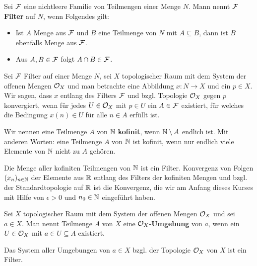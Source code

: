 \begin{defn}
	Sei $\mathcal{F}$ eine nichtleere Familie von Teilmengen einer Menge $N$. Mann nennt $\mathcal{F}$ \textbf{Filter} auf $N$, wenn Folgendes gilt: 
	\begin{itemize} 
		\item Ist $A$ Menge aus $\mathcal{F}$ und $B$ eine Teilmenge von $N$ mit $A \subseteq B$, dann ist $B$ ebenfalls Menge aus $\mathcal{F}$. 
		\item Aus $A, B \in \mathcal{F}$ folgt $A \cap B \in \mathcal{F}$. 
	\end{itemize} 
\end{defn} 

\begin{defn} 
	Sei $\mathcal{F}$ Filter auf einer Menge $N$, sei $X$ topologischer Raum mit dem System der offenen Mengen $\mathcal{O}_X$ und man betrachte eine Abbildung
	 $ x : N \to X$ und ein $p \in X$. Wir sagen, dass $x$ entlang des Filters $\mathcal{F}$ und bzgl. Topologie $\mathcal{O}_X$ gegen $p$ konvergiert, wenn für jedes $U \in \mathcal{O}_X$ mit $p \in U$ ein $A \in \mathcal{F}$ existiert, für welches die Bedingung $x(n) \in U$ für alle $n \in A$ erfüllt ist. 
\end{defn} 

\begin{defn} 
	Wir nennen eine Teilmenge $A$ von $\mathbb{N}$ \textbf{kofinit}, wenn $\mathbb{N} \setminus A$ endlich ist. Mit anderen Worten: eine Teilmenge $A$ von $\mathbb{N}$ ist kofinit, wenn nur endlich viele Elemente von $\mathbb{N}$ nicht zu $A$ gehören.
\end{defn} 

\begin{bem}
	Die Menge aller kofiniten Teilmengen von $\mathbb{N}$ ist ein Filter. Konvergenz von Folgen $(x_n)_{n \in \mathbb{N}}$ der Elemente aus $\mathbb{R}$ entlang des Filters der kofiniten Mengen und bzgl. der Standardtopologie auf $\mathbb{R}$ ist die Konvergenz, die wir am Anfang dieses Kurses mit Hilfe von $\epsilon>0$ und $n_0 \in \mathbb{N}$ eingeführt haben. 
\end{bem} 

\begin{defn} 
	Sei $X$ topologischer Raum mit dem System der offenen Mengen $\mathcal{O}_X$ und sei $a \in X$. Man nennt  Teilmenge $A$ von $X$ eine $\mathcal{O}_X$-\textbf{Umgebung} von $a$, wenn ein $U \in \mathcal{O}_X$ mit $a \in U \subseteq A$ existiert. 
\end{defn} 

\begin{bem}
	Das System aller Umgebungen von $a \in X$ bzgl. der Topologie $\mathcal{O}_X$ von $X$ ist ein Filter. 
\end{bem} 

